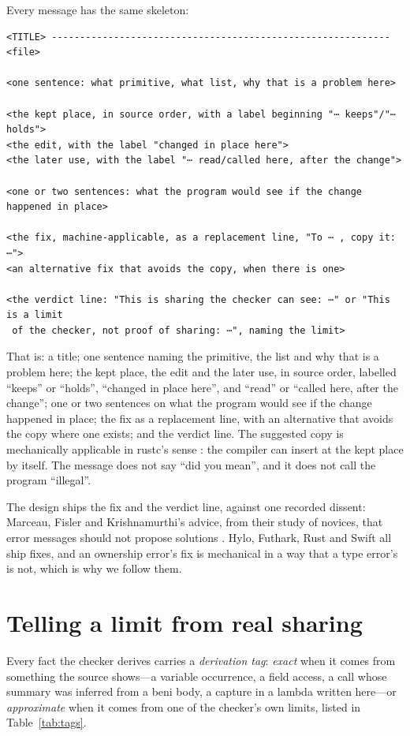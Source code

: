 Every message has the same skeleton:
\begin{Verbatim}
<TITLE> ------------------------------------------------------------ <file>

<one sentence: what primitive, what list, why that is a problem here>

<the kept place, in source order, with a label beginning "⋯ keeps"/"⋯ holds">
<the edit, with the label "changed in place here">
<the later use, with the label "⋯ read/called here, after the change">

<one or two sentences: what the program would see if the change happened in place>

<the fix, machine-applicable, as a replacement line, "To ⋯ , copy it: ⋯">
<an alternative fix that avoids the copy, when there is one>

<the verdict line: "This is sharing the checker can see: ⋯" or "This is a limit
 of the checker, not proof of sharing: ⋯", naming the limit>
\end{Verbatim}
That is: a title; one sentence naming the primitive, the list and why that is a problem here; the kept
place, the edit and the later use, in source order, labelled ``keeps'' or ``holds'', ``changed in place
here'', and ``read'' or ``called here, after the change''; one or two sentences on what the program would
see if the change happened in place; the fix as a replacement line, with an alternative that avoids the
copy where one exists; and the verdict line. The suggested copy is mechanically applicable in rustc's
sense \citep{rustc2026diagnostics}: the compiler can insert  at the kept place by itself.
The message does not say ``did you mean'', and it does not call the program ``illegal''.

The design ships the fix and the verdict line, against one recorded dissent: Marceau, Fisler and
Krishnamurthi's advice, from their study of novices, that error messages should not propose
solutions \citep{marceau2011mind}. Hylo, Futhark, Rust and Swift all ship fixes, and an ownership
error's fix is mechanical in a way that a type error's is not, which is why we follow them.

\section{Telling a limit from real sharing}
\label{sec:errors-tags}

Every fact the checker derives carries a \emph{derivation tag}: \emph{exact} when it comes from
something the source shows---a variable occurrence, a field access, a call whose summary was inferred
from a beni body, a capture in a lambda written here---or \emph{approximate} when it comes from one of
the checker's own limits, listed in Table~\ref{tab:tags}.

